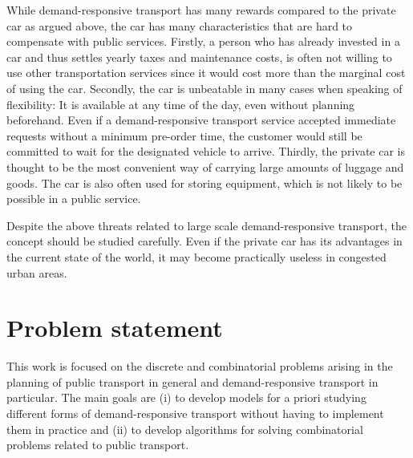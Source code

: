 \documentclass[dissertation,draft*]{aaltoseries}
\begin{document}
While demand-responsive transport has many rewards compared to the private car as argued above,
the car has many characteristics that are hard to compensate with public services. 
Firstly, a person who has already invested in a car and thus settles yearly taxes and
maintenance costs, is often not willing to use other transportation services since it would
cost more than the marginal cost of using the car.
Secondly, the car is unbeatable in many cases when speaking of flexibility: 
It is available at any time of the day, even without planning beforehand. 
Even if a demand-responsive transport service accepted immediate requests without
a minimum pre-order time, the customer would still be committed to wait for the 
designated vehicle to arrive. Thirdly, the private car is thought to be the most convenient 
way of carrying large amounts of luggage and goods. The car is also often used for
storing equipment, which is not likely to be possible in a public service. 

Despite the above threats related to large scale 
demand-responsive transport, the concept should be studied carefully.
Even if the private car has its advantages in the current state of the world,
it may become practically useless in congested urban areas.

%
%
%
%
%
%
%
%
%
%
%
%
%

\section{Problem statement}
This work is focused on the discrete and combinatorial problems arising in the planning of
public transport in general and demand-responsive transport in particular. The main goals are (i) to develop models for a priori studying 
different forms of demand-responsive transport without having to implement them in practice and (ii) to
develop algorithms for solving combinatorial problems related to public transport.
\end{document}
